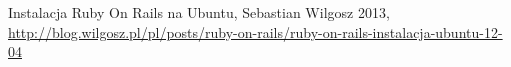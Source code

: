 \FloatBarrier
\begin{thebibliography}{1}
	 Instalacja Ruby On Rails na Ubuntu, Sebastian Wilgosz 2013, \url{http://blog.wilgosz.pl/pl/posts/ruby-on-rails/ruby-on-rails-instalacja-ubuntu-12-04}
\end{thebibliography}
